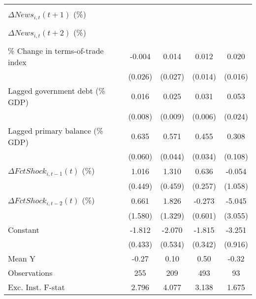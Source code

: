 {\begin{tabular}{l*{4}{c}}
                    &                     &                     &                     &                     \\
\addlinespace
$ \Delta News_{i,t}(t+1)$ (\%)&                     &                     &                     &                     \\
                    &                     &                     &                     &                     \\
\addlinespace
$ \Delta News_{i,t}(t+2)$ (\%)&                     &                     &                     &                     \\
                    &                     &                     &                     &                     \\
\addlinespace
\% Change in terms-of-trade index&      -0.004         &       0.014         &       0.012         &       0.020         \\
                    &     (0.026)         &     (0.027)         &     (0.014)         &     (0.016)         \\
\addlinespace
Lagged government debt (\% GDP)&       0.016\sym{*}  &       0.025\sym{**} &       0.031\sym{***}&       0.053\sym{**} \\
                    &     (0.008)         &     (0.009)         &     (0.006)         &     (0.024)         \\
\addlinespace
Lagged primary balance (\% GDP)&       0.635\sym{***}&       0.571\sym{***}&       0.455\sym{***}&       0.308\sym{**} \\
                    &     (0.060)         &     (0.044)         &     (0.034)         &     (0.108)         \\
\addlinespace
$ \Delta FctShock_{i,t-1}(t)$ (\%)&       1.016\sym{**} &       1.310\sym{**} &       0.636\sym{**} &      -0.054         \\
                    &     (0.449)         &     (0.459)         &     (0.257)         &     (1.058)         \\
\addlinespace
$ \Delta FctShock_{i,t-2}(t)$ (\%)&       0.661         &       1.826         &      -0.273         &      -5.045         \\
                    &     (1.580)         &     (1.329)         &     (0.601)         &     (3.055)         \\
\addlinespace
Constant            &      -1.812\sym{***}&      -2.070\sym{***}&      -1.815\sym{***}&      -3.251\sym{***}\\
                    &     (0.433)         &     (0.534)         &     (0.342)         &     (0.916)         \\
\midrule
Mean Y              &       -0.27         &        0.10         &        0.50         &       -0.32         \\
Observations        &         255         &         209         &         493         &          93         \\
Exc. Inst. F-stat   &       2.796         &       4.077         &       3.138         &       1.675         \\
\bottomrule
\end{tabular}
}
